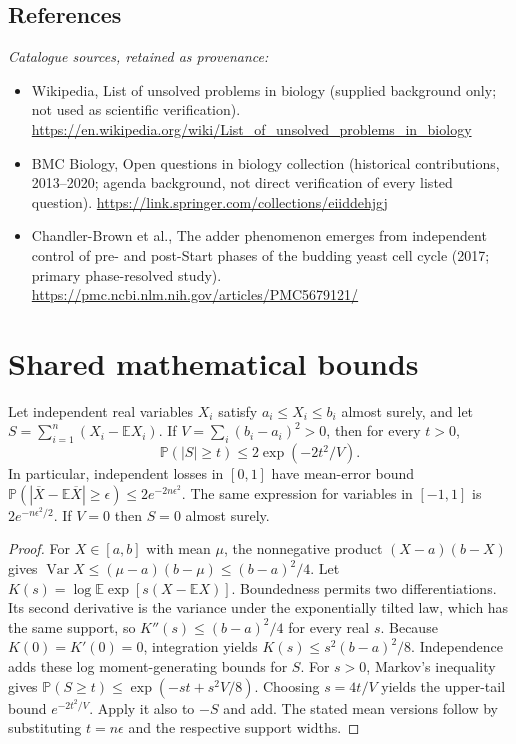 \documentclass[11pt]{article}
\begin{document}
\subsection{References}
\noindent\emph{Catalogue sources, retained as provenance:}
\begin{itemize}
\item Wikipedia, List of unsolved problems in biology (supplied background only; not used as scientific verification). \url{https://en.wikipedia.org/wiki/List_of_unsolved_problems_in_biology}
\item BMC Biology, Open questions in biology collection (historical contributions, 2013--2020; agenda background, not direct verification of every listed question). \url{https://link.springer.com/collections/eiiddehjgj}
\item Chandler-Brown et al., The adder phenomenon emerges from independent control of pre- and post-Start phases of the budding yeast cell cycle (2017; primary phase-resolved study). \url{https://pmc.ncbi.nlm.nih.gov/articles/PMC5679121/}
\end{itemize}




\section{Shared mathematical bounds}\label{app:bounds}
\begin{lemma}\label{lem:bounded}
Let independent real variables $X_i$ satisfy $a_i\leq X_i\leq b_i$ almost surely,
and let $S=\sum_{i=1}^n(X_i-\mathbb{E} X_i)$. If
$V=\sum_i(b_i-a_i)^2>0$, then for every $t>0$,
\[
 \mathbb{P}(|S|\geq t)\leq 2\exp(-2t^2/V).
\]
In particular, independent losses in $[0,1]$ have mean-error bound
$\mathbb{P}(|\overline X-\mathbb{E}\overline X|\geq\epsilon)
\leq2e^{-2n\epsilon^2}$. The same expression for variables in $[-1,1]$
is $2e^{-n\epsilon^2/2}$. If $V=0$ then $S=0$ almost surely.
\end{lemma}
\begin{proof}
For $X\in[a,b]$ with mean $\mu$, the nonnegative product
$(X-a)(b-X)$ gives
$\operatorname{Var} X\leq(\mu-a)(b-\mu)\leq(b-a)^2/4$.
Let $K(s)=\log\mathbb{E}\exp[s(X-\mathbb{E} X)]$.
Boundedness permits two differentiations. Its second derivative is the variance
under the exponentially tilted law, which has the same support, so
$K''(s)\leq(b-a)^2/4$ for every real $s$.
Because $K(0)=K'(0)=0$, integration yields
$K(s)\leq s^2(b-a)^2/8$.
Independence adds these log moment-generating bounds for $S$.
For $s>0$, Markov's inequality gives
$\mathbb{P}(S\geq t)\leq\exp(-st+s^2V/8)$.
Choosing $s=4t/V$ yields the upper-tail bound $e^{-2t^2/V}$.
Apply it also to $-S$ and add. The stated mean versions follow by substituting
$t=n\epsilon$ and the respective support widths.
\end{proof}
\end{document}
